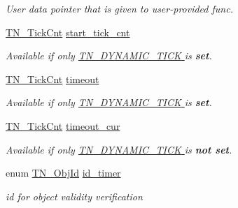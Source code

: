 \begin{DoxyCompactItemize}
\begin{DoxyCompactList}\small\item\em User data pointer that is given to user-\/provided {\ttfamily func}. \end{DoxyCompactList}\item 
\hyperlink{tn__common_8h_ac885b63d00c063de61cdbd80bf26d8aa}{T\+N\+\_\+\+Tick\+Cnt} \hyperlink{structTN__Timer_ab1410fa78c9099a6bc4dd3f43f1f52e4}{start\+\_\+tick\+\_\+cnt}
\begin{DoxyCompactList}\small\item\em {\itshape Available if only \hyperlink{tn__cfg__default_8h_aaee875834a86f961318c584095c366fe}{{\ttfamily T\+N\+\_\+\+D\+Y\+N\+A\+M\+I\+C\+\_\+\+T\+I\+C\+K} } is {\bfseries set}.} \end{DoxyCompactList}\item 
\hyperlink{tn__common_8h_ac885b63d00c063de61cdbd80bf26d8aa}{T\+N\+\_\+\+Tick\+Cnt} \hyperlink{structTN__Timer_a893c5b01ec38bdcbcf2294cc950ffd09}{timeout}
\begin{DoxyCompactList}\small\item\em {\itshape Available if only \hyperlink{tn__cfg__default_8h_aaee875834a86f961318c584095c366fe}{{\ttfamily T\+N\+\_\+\+D\+Y\+N\+A\+M\+I\+C\+\_\+\+T\+I\+C\+K} } is {\bfseries set}.} \end{DoxyCompactList}\item 
\hyperlink{tn__common_8h_ac885b63d00c063de61cdbd80bf26d8aa}{T\+N\+\_\+\+Tick\+Cnt} \hyperlink{structTN__Timer_a6041c660dad74778f668bac9ae844465}{timeout\+\_\+cur}
\begin{DoxyCompactList}\small\item\em {\itshape Available if only \hyperlink{tn__cfg__default_8h_aaee875834a86f961318c584095c366fe}{{\ttfamily T\+N\+\_\+\+D\+Y\+N\+A\+M\+I\+C\+\_\+\+T\+I\+C\+K} } is {\bfseries not set}.} \end{DoxyCompactList}\item 
\hypertarget{structTN__Timer_a27482d3470455064da95b9453ae87156}{enum \hyperlink{tn__common_8h_ae779dd1f6735f6e139fb70acd004d976}{T\+N\+\_\+\+Obj\+Id} \hyperlink{structTN__Timer_a27482d3470455064da95b9453ae87156}{id\+\_\+timer}}\label{structTN__Timer_a27482d3470455064da95b9453ae87156}

\begin{DoxyCompactList}\small\item\em id for object validity verification \end{DoxyCompactList}\end{DoxyCompactItemize}


